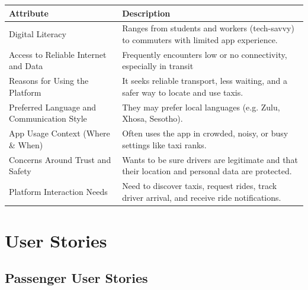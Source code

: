 \documentclass[a4paper,12pt]{article}
\begin{document}
\begin{longtable}{>{\raggedright}p{5cm} p{10cm}}
\toprule
\textbf{Attribute} & \textbf{Description} \\
\midrule
Digital Literacy & Ranges from students and workers (tech-savvy) to commuters with limited app experience. \\
Access to Reliable Internet and Data & Frequently encounters low or no connectivity, especially in transit \\
Reasons for Using the Platform & It seeks reliable transport, less waiting, and a safer way to locate and use taxis. \\
Preferred Language and Communication Style & They may prefer local languages (e.g. Zulu, Xhosa, Sesotho). \\
App Usage Context (Where \& When) & Often uses the app in crowded, noisy, or busy settings like taxi ranks. \\
Concerns Around Trust and Safety & Wants to be sure drivers are legitimate and that their location and personal data are protected. \\
Platform Interaction Needs & Need to discover taxis, request rides, track driver arrival, and receive ride notifications. \\
\bottomrule
\end{longtable}

\section{User Stories}

\subsection{Passenger User Stories}
\end{document}
